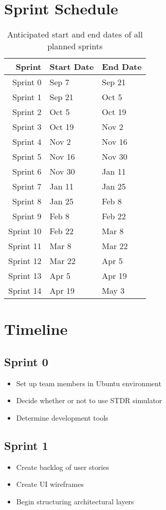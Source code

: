 \section{Sprint Schedule}
\begin{table}[h]
\begin{center}
	\begin{tabular}{r | l l}
		Sprint & Start Date & End Date \\ \hline
		Sprint 0 & Sep 7 & Sep 21 \\
		Sprint 1 & Sep 21 & Oct 5 \\
		Sprint 2 & Oct 5 & Oct 19 \\
		Sprint 3 & Oct 19 & Nov 2 \\
		Sprint 4 & Nov 2 & Nov 16 \\
		Sprint 5 & Nov 16 & Nov 30 \\
		Sprint 6 & Nov 30 & Jan 11 \\
		Sprint 7 & Jan 11 & Jan 25 \\
		Sprint 8 & Jan 25 & Feb 8 \\
		Sprint 9 & Feb 8 & Feb 22 \\
		Sprint 10 & Feb 22 & Mar 8 \\
		Sprint 11 & Mar 8 & Mar 22 \\
		Sprint 12 & Mar 22 & Apr 5 \\
		Sprint 13 & Apr 5 & Apr 19 \\
		Sprint 14 & Apr 19 & May 3 \\
	\end{tabular}
\end{center}
\caption{Anticipated start and end dates of all planned sprints}
\end{table}

\section{Timeline}
\subsection{Sprint 0}
\begin{itemize}
	\item Set up team members in Ubuntu environment
	\item Decide whether or not to use STDR simulator 
 	\item Determine development tools
\end{itemize}

\subsection{Sprint 1}
\begin{itemize}
	\item Create backlog of user stories
	\item Create UI wireframes
 	\item Begin structuring architectural layers
\end{itemize}


